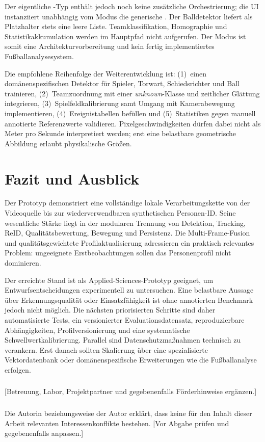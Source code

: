 \documentclass[runningheads]{llncs}
\newcommand{\todoentry}[1]{\textcolor{red!70!black}{[#1]}}
\begin{document}
Der eigentliche -Typ enthält jedoch noch keine zusätzliche Orchestrierung; die UI instanziiert unabhängig vom Modus die generische . Der Balldetektor liefert als Platzhalter stets eine leere Liste. Teamklassifikation, Homographie und Statistikakkumulation werden im Hauptpfad nicht aufgerufen. Der Modus ist somit eine Architekturvorbereitung und kein fertig implementiertes Fußballanalysesystem.

Die empfohlene Reihenfolge der Weiterentwicklung ist: (1)~einen domänenspezifischen Detektor für Spieler, Torwart, Schiedsrichter und Ball trainieren, (2)~Teamzuordnung mit einer \emph{unknown}-Klasse und zeitlicher Glättung integrieren, (3)~Spielfeldkalibrierung samt Umgang mit Kamerabewegung implementieren, (4)~Ereignistabellen befüllen und (5)~Statistiken gegen manuell annotierte Referenzwerte validieren. Pixelgeschwindigkeiten dürfen dabei nicht als Meter pro Sekunde interpretiert werden; erst eine belastbare geometrische Abbildung erlaubt physikalische Größen.

\section{Fazit und Ausblick}

Der Prototyp demonstriert eine vollständige lokale Verarbeitungskette von der Videoquelle bis zur wiederverwendbaren synthetischen Personen-ID. Seine wesentliche Stärke liegt in der modularen Trennung von Detektion, Tracking, ReID, Qualitätsbewertung, Bewegung und Persistenz. Die Multi-Frame-Fusion und qualitätsgewichtete Profilaktualisierung adressieren ein praktisch relevantes Problem: ungeeignete Erstbeobachtungen sollen das Personenprofil nicht dominieren.

Der erreichte Stand ist als Applied-Sciences-Prototyp geeignet, um Entwurfsentscheidungen experimentell zu untersuchen. Eine belastbare Aussage über Erkennungsqualität oder Einsatzfähigkeit ist ohne annotierten Benchmark jedoch nicht möglich. Die nächsten priorisierten Schritte sind daher automatisierte Tests, ein versionierter Evaluationsdatensatz, reproduzierbare Abhängigkeiten, Profilversionierung und eine systematische Schwellwertkalibrierung. Parallel sind Datenschutzmaßnahmen technisch zu verankern. Erst danach sollten Skalierung über eine spezialisierte Vektordatenbank oder domänenspezifische Erweiterungen wie die Fußballanalyse erfolgen.

\begin{credits}
\subsubsection{\ackname}
\todoentry{Betreuung, Labor, Projektpartner und gegebenenfalls Förderhinweise ergänzen.}

\subsubsection{\discintname}
Die Autorin beziehungsweise der Autor erklärt, dass keine für den Inhalt dieser Arbeit relevanten Interessenkonflikte bestehen. \todoentry{Vor Abgabe prüfen und gegebenenfalls anpassen.}
\end{credits}
\end{document}
